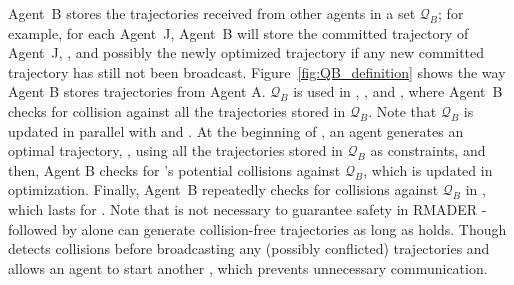 \begin{table}[h]
\begin{centering}
\caption{\centering Differences between MADER and RMADER}
\label{tab:mader_vs_rmader}
\renewcommand{\arraystretch}{1.1}
\par\end{centering}
\end{table}

\newcommand{\QB}{\ensuremath{\mathcal{Q}_B}}

Agent~B stores the trajectories received from other agents in a set \QB{}; for example, for each Agent~J, Agent~B will store the committed trajectory of Agent~J, \trajJ{}, and possibly the newly optimized trajectory \trajJNew{} if any new committed trajectory has still not been broadcast. Figure~\ref{fig:QB_definition} shows the way Agent B stores trajectories from Agent A. 
\QB{} is used in \OStep{}, \CheckStep{}, and \DCStep{},  where Agent~B checks for collision against all the trajectories stored in \QB{}. Note that \QB{} is updated in parallel with \OStep{} and \DCStep{}. 
At the beginning of \OStepB{}, an agent generates an optimal trajectory, \trajBNew{}, using all the trajectories stored in \QB{} as constraints, and then, Agent B checks for \trajBNew{}'s potential collisions against \QB{}, which is updated in optimization. 
Finally, Agent~B repeatedly checks for collisions against \QB{} in \DCStepB{}, which lasts for \delayParameter{}. 
Note that \CStep{} is not necessary to guarantee safety in RMADER - \OStep{} followed by \DCStep{} alone can generate collision-free trajectories as long as \NeccessaryCond{} holds. Though \CStep{} detects collisions before broadcasting any (possibly conflicted) trajectories and allows an agent to start another \OStep{}, which prevents unnecessary communication.


